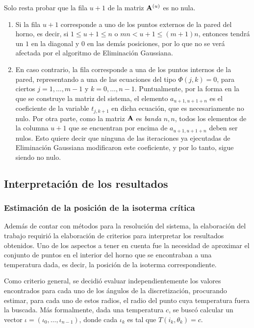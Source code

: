 \begin{enumerate}[label=(\roman*)]
            Solo resta probar que la fila $u+1$ de la matriz $\mathbf{A}^{(u)}$ es no nula.
            \begin{enumerate}[label=(\alph*)]
                \item Si la fila $u + 1$ corresponde a uno de los puntos externos de la pared del horno, es decir, si $1 \leq u+1 \leq n$ o $mn < u + 1 \leq (m+1)n$, entonces tendrá un $1$ en la diagonal y $0$ en las demás posiciones, por lo que no se verá afectada por el algoritmo de Eliminación Gaussiana.
                \item En caso contrario, la fila corresponde a una de los puntos internos de la pared, representando a una de las ecuaciones del tipo $\Phi(j,k) = 0$, para ciertos $j = 1, \dots, m - 1$ y $k = 0, \dots, n - 1$. Puntualmente, por la forma en la que se construye la matriz del sistema, el elemento $a_{u+1,u+1+n}$ es el coeficiente de la variable $t_{j,k+1}$ en dicha ecuación, que es necesariamente no nulo. Por otra parte, como la matriz $\mathbf{A}$ es \emph{banda} $n, n$, todos los elementos de la columna $u+1$ que se encuentran por encima de $a_{u+1,u+1+n}$ deben ser nulos. Esto quiere decir que ninguna de las iteraciones ya ejecutadas de Eliminación Gaussiana modificaron este coeficiente, y por lo tanto, sigue siendo no nulo.
            \end{enumerate}
        \end{enumerate}

    \subsection{Interpretación de los resultados}

        \subsubsection{Estimación de la posición de la isoterma crítica}

            Además de contar con métodos para la resolución del sistema, la elaboración del trabajo requirió la elaboración de criterios para interpretar los resultados obtenidos. Uno de los aspectos a tener en cuenta fue la necesidad de aproximar el conjunto de puntos en el interior del horno que se encontraban a una temperatura dada, es decir, la posición de la isoterma correspondiente.

            Como criterio general, se decidió evaluar independientemente los valores encontrados para cada uno de los ángulos de la discretización, procurando estimar, para cada uno de estos radios, el radio del punto cuya temperatura fuera la buscada. Más formalmente, dada una temperatura $c$, se buscó calcular un vector $\iota = (\iota_0, \dots, \iota_{n-1})$, donde cada $\iota_k$ es tal que $T(i_k, \theta_k) = c$.

